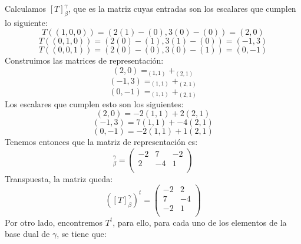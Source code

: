 \begin{enumerate}
    Calculamos $[T]_{\beta}^{\gamma}$, que es la matriz cuyas entradas son los escalares que cumplen lo siguiente:
    \begin{equation*}
        T((1,0,0))=(2(1)-(0),3(0)-(0))= (2,0)
    \end{equation*}
    \begin{equation*}
        T((0,1,0))=(2(0)-(1),3(1)-(0))= (-1,3)
    \end{equation*}
    \begin{equation*}
        T((0,0,1))=(2(0)-(0),3(0)-(1))= (0,-1)
    \end{equation*}
    Construimos las matrices de representación:
    \begin{equation*}
        (2,0)=_(1, 1)+_(2, 1)
    \end{equation*}
    \begin{equation*}
        (-1,3)=_(1, 1)+_(2, 1)
    \end{equation*}
    \begin{equation*}
        (0,-1)=_(1, 1)+_(2, 1)
    \end{equation*}
    Los escalares que cumplen esto son los siguientes:
    \begin{equation*}
        (2,0)=-2(1, 1)+2(2, 1)
    \end{equation*}
    \begin{equation*}
        (-1,3)=7(1, 1)+-4(2, 1)
    \end{equation*}
    \begin{equation*}
        (0,-1)=-2(1, 1)+1(2, 1)
    \end{equation*}
    Tenemos entonces que la matriz de representación es:
    \begin{equation*}
        [T]_{\beta}^{\gamma}=\begin{pmatrix}
            -2 & 7 & -2\\
           2 & -4 & 1 \\
        \end{pmatrix}
    \end{equation*}
    Transpuesta, la matriz queda:
    \begin{equation*}
        ([T]_{\beta}^{\gamma})^t=\begin{pmatrix}
            -2 & 2\\
           7 & -4 \\
           -2 & 1 \\
        \end{pmatrix}
    \end{equation*}
    Por otro lado, encontremos $T^t$, para ello, para cada uno de los elementos de la base dual de $\gamma$, se tiene que:

\end{enumerate}
